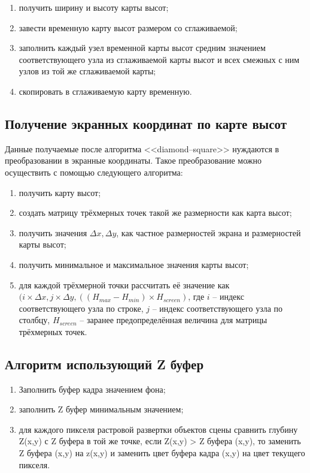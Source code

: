 \begin{enumerate}
	\item получить ширину и высоту карты высот;
	\item завести временную карту высот размером со сглаживаемой;
	\item заполнить каждый узел временной карты высот средним значением соответствующего узла из сглаживаемой карты высот и всех смежных с ним узлов из той же сглаживаемой карты;
	\item скопировать в сглаживаемую карту временную.
\end{enumerate}

\subsection{Получение экранных координат по карте высот}

Данные получаемые после алгоритма <<diamond--square>> нуждаются в преобразовании в экранные координаты. Такое преобразование можно осуществить с помощью следующего алгоритма:

\begin{enumerate}
	\item получить карту высот;
	\item создать матрицу трёхмерных точек такой же размерности как карта высот;
	\item получить значения $\Delta x, \Delta y$, как частное размерностей экрана и размерностей карты высот;
	\item получить минимальное и максимальное значения карты высот;
	\item для каждой трёхмерной точки рассчитать её значение как \\ $(i \times \Delta x, j \times \Delta y, ((H_{max} - H_{min}) \times H_{screen})$, где $i$ -- индекс соответствующего узла по строке, $j$ -- индекс соответствующего узла по столбцу, $H_{screen}$ -- заранее предопределённая величина для матрицы трёхмерных точек.
\end{enumerate}

\subsection{Алгоритм использующий Z буфер}

\begin{enumerate}
	\item Заполнить буфер кадра значением фона;
	\item заполнить Z буфер минимальным значением;
	\item для каждого пикселя растровой развертки объектов сцены сравнить глубину Z(x,y) с Z буфера в той же точке, если Z(x,y) > Z буфера (x,y), то заменить Z буфера (x,y) на z(x,y) и заменить цвет буфера кадра (x,y) на цвет текущего пикселя. 
\end{enumerate}


